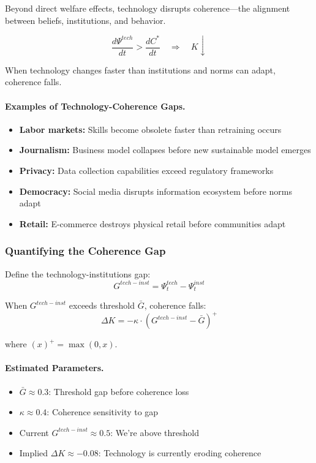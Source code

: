 Beyond direct welfare effects, technology disrupts coherence---the alignment 
between beliefs, institutions, and behavior.

\begin{equation}
\frac{d\Psi^{tech}}{dt} > \frac{dC^*}{dt} \quad \Rightarrow \quad K \downarrow
\label{eq:coherence-disruption}
\end{equation}

When technology changes faster than institutions and norms can adapt, coherence falls.

\paragraph{Examples of Technology-Coherence Gaps.}
\begin{itemize}
    \item \textbf{Labor markets:} Skills become obsolete faster than retraining occurs
    \item \textbf{Journalism:} Business model collapses before new sustainable model emerges
    \item \textbf{Privacy:} Data collection capabilities exceed regulatory frameworks
    \item \textbf{Democracy:} Social media disrupts information ecosystem before norms adapt
    \item \textbf{Retail:} E-commerce destroys physical retail before communities adapt
\end{itemize}

\subsubsection{Quantifying the Coherence Gap}

Define the technology-institutions gap:
\begin{equation}
G^{tech-inst} = \Psi^{tech}_t - \Psi^{inst}_t
\end{equation}

When $G^{tech-inst}$ exceeds threshold $\bar{G}$, coherence falls:
\begin{equation}
\Delta K = -\kappa \cdot (G^{tech-inst} - \bar{G})^+ 
\end{equation}

where $(x)^+ = \max(0, x)$.

\paragraph{Estimated Parameters.}
\begin{itemize}
    \item $\bar{G} \approx 0.3$: Threshold gap before coherence loss
    \item $\kappa \approx 0.4$: Coherence sensitivity to gap
    \item Current $G^{tech-inst} \approx 0.5$: We're above threshold
    \item Implied $\Delta K \approx -0.08$: Technology is currently eroding coherence
\end{itemize}

